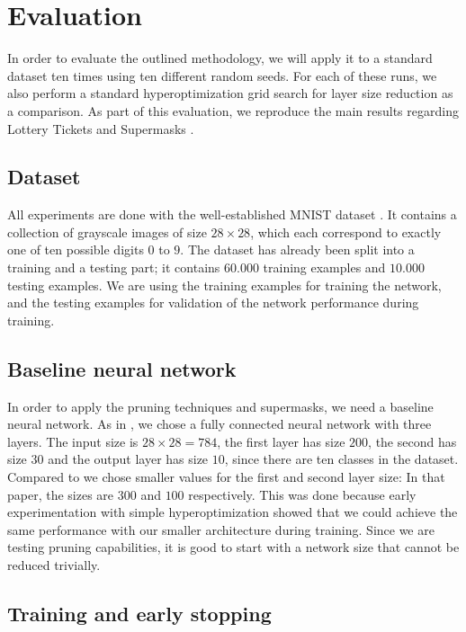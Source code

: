 \documentclass[12pt,final,twoside]{article}
\theoremstyle{plain}
\theoremstyle{definition}
\theoremstyle{remark}
\theoremstyle{named}
\begin{document}
\section{Evaluation}
In order to evaluate the outlined methodology, we will apply it to a standard dataset ten times using ten different random seeds. For each of these runs, we also perform a standard hyperoptimization grid search for layer size reduction as a comparison. As part of this evaluation, we reproduce the main results regarding Lottery Tickets \cite{lottery} and Supermasks \cite{supermask}.

\subsection{Dataset}

All experiments are done with the well-established MNIST dataset \cite{mnist}. It contains a collection of grayscale images of size $28 \times 28$, which each correspond to exactly one of ten possible digits $0$ to $9$. The dataset has already been split into a training and a testing part; it contains $60.000$ training examples and $10.000$ testing examples. We are using the training examples for training the network, and the testing examples for validation of the network performance during training.

\subsection{Baseline neural network}

In order to apply the pruning techniques and supermasks, we need a baseline neural network. As in \cite{supermask}, we chose a fully connected neural network with three layers. The input size is $28 \times 28 = 784$, the first layer has size $200$, the second has size $30$ and the output layer has size $10$, since there are ten classes in the dataset. Compared to \cite{supermask} we chose smaller values for the first and second layer size: In that paper, the sizes are $300$ and $100$ respectively. This was done because early experimentation with simple hyperoptimization showed that we could achieve the same performance with our smaller architecture during training. Since we are testing pruning capabilities, it is good to start with a network size that cannot be reduced trivially.


\subsection{Training and early stopping}
\end{document}
